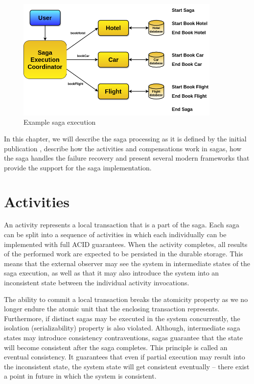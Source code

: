 \documentclass[oneside,
  digital, %
  table,   %
  nolof,     %
  nolot,     %
]{fithesis3}
\begin{document}
\begin{figure}
    \begin{center}
        \includegraphics[height=60mm]{images/tripExample.png}
    \end{center}
    \caption{Example saga execution}
    \label{fig:tripExample}
\end{figure}

In this chapter, we will describe the saga processing as it is defined by the initial publication \cite{sagas_publ}, describe how the activities and compensations work in sagas, how the saga handles the failure recovery and present several modern frameworks that provide the support for the saga implementation.

\section{Activities}

An activity represents a local transaction that is a part of the saga. Each saga can be split into a sequence of activities in which each individually can be implemented with full ACID guarantees. When the activity completes, all results of the performed work are expected to be persisted in the durable storage. This means that the external observer may see the system in intermediate states of the saga execution, as well as that it may also introduce the system into an inconsistent state between the individual activity invocations.

The ability to commit a local transaction breaks the atomicity property as we no longer endure the atomic unit that the enclosing transaction represents. Furthermore, if distinct sagas may be executed in the system concurrently, the isolation (serializability) property is also violated. Although, intermediate saga states may introduce consistency contraventions, sagas guarantee that the state will become consistent after the saga completes. This principle is called an eventual consistency. It guarantees that even if partial execution may result into the inconsistent state, the system state will get consistent eventually -- there exist a point in future in which the system is consistent.
\end{document}
